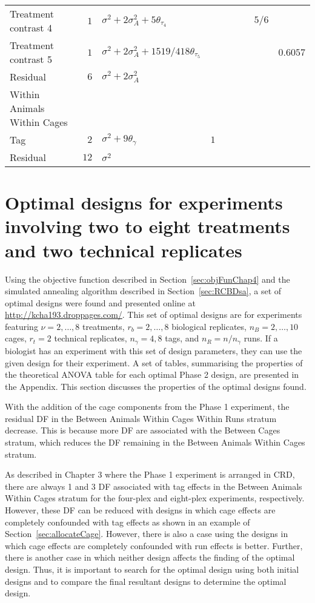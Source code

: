 \begin{landscape}
\begin{table}[ht]
\begin{tabular}{lrlllllll}
 \quad \quad Treatment contrast 4 & $1$ & $\sigma^2+2\sigma_{A}^2+5\theta_{\tau_4}$ & &  &  &  & $5/6$ & \\ 
 \quad \quad Treatment contrast 5 & $1$ & $\sigma^2+2\sigma_{A}^2+1519/418\theta_{\tau_5}$ & &  &  &  &  & $0.6057$\\ 
 \quad \quad Residual & $6$ & $\sigma^2+2\sigma_{A}^2$ & &  &  &  &  & \\ \hline
 \quad Within Animals Within Cages &  &  & &  &  &  &  & \\ 
 \quad \quad Tag & $2$ & $\sigma^2+9\theta_{\gamma}$ &$1$ &  &  &  &  & \\ 
 \quad \quad Residual & $12$ & $\sigma^2$ & &  &  &  &  & \\ 
 \bottomrule 
 \end{tabular} 
 \label{tab:Phase2ANOVAEX1trtContr} 
\end{table} 
\end{landscape}

\section{Optimal designs for experiments involving two to eight treatments and two technical replicates}
\label{sec:overSumChap4}
Using the objective function described in Section~\ref{sec:objFunChap4} and the simulated annealing algorithm described in Section~\ref{sec:RCBDsa}, a set of optimal designs were found and presented online at \url{http://kcha193.droppages.com/}. This set of optimal designs are for experiments featuring $\nu = 2,\dots,8$ treatments, $r_b = 2,\dots, 8$ biological replicates, $n_B = 2, \dots, 10$ cages, $r_t = 2$ technical replicates, $n_\gamma = 4, 8$ tags, and $n_R = n/n_\gamma$ runs. If a biologist has an experiment with this set of design parameters, they can use the given design for their experiment. A set of tables, summarising the properties of the theoretical ANOVA table for each optimal Phase 2 design, are presented in the Appendix. This section discusses the properties of the optimal designs found.  

With the addition of the cage components from the Phase 1 experiment, the residual DF in the Between Animals Within Cages Within Runs stratum decrease. This is because more DF are associated with the Between Cages stratum, which reduces the DF remaining in the Between Animals Within Cages stratum. 

As described in Chapter 3 where the Phase 1 experiment is arranged in CRD, there are always 1 and 3 DF associated with tag effects in the Between Animals Within Cages stratum for the four-plex and eight-plex experiments, respectively. However, these DF can be reduced with designs in which cage effects are completely confounded with tag effects as shown in an example of Section~\ref{sec:allocateCage}. However, there is also a case using the designs in which cage effects are completely confounded with run effects is better. Further, there is another case in which neither design affects the finding of the optimal design. Thus, it is important to search for the optimal design using both initial designs and to compare the final resultant designs to determine the optimal design. 

